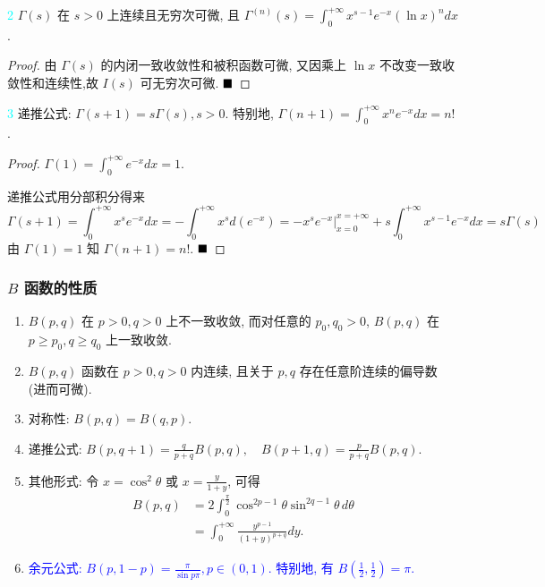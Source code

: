 \documentclass[lang=cn,newtx,10pt,scheme=chinese]{elegantbook}
\begin{document}
\begin{property}\textcolor{cyan}{2}
$\Gamma(s)$ 在 $s>0$ 上连续且无穷次可微, 且 $\Gamma^{(n)}(s) = \int_{0}^{+\infty} x^{s-1}e^{-x}(\ln x)^n dx$.
\end{property}
\begin{proof}
   由 $\Gamma(s)$ 的内闭一致收敛性和被积函数可微, 又因乘上 $\ln x$ 不改变一致收敛性和连续性,故 $I(s)$ 可无穷次可微. $\hfill \blacksquare$
\end{proof}

\begin{property}\textcolor{cyan}{3}
递推公式: $\Gamma(s+1)=s\Gamma(s), s>0$. 特别地, $\Gamma(n+1) = \int_0^{+\infty} x^n e^{-x} dx = n!$.
\end{property}
\begin{proof}
$\Gamma(1) = \int_0^{+\infty} e^{-x} dx = 1$.

递推公式用分部积分得来
$$ \Gamma(s+1) = \int_0^{+\infty} x^s e^{-x} dx = -\int_0^{+\infty} x^s d(e^{-x}) = -x^s e^{-x} \Big|_{x=0}^{x=+\infty} + s \int_0^{+\infty} x^{s-1} e^{-x} dx = s\Gamma(s) $$
由 $\Gamma(1)=1$ 知 $\Gamma(n+1) = n!$.
$\hfill \blacksquare$
\end{proof}

\subsubsection{$B$ 函数的性质}

\begin{enumerate}
    \item $B(p, q)$ 在 $p>0, q>0$ 上不一致收敛, 而对任意的 $p_0, q_0 > 0$, $B(p, q)$ 在 $p \ge p_0, q \ge q_0$ 上一致收敛.
    \item $B(p, q)$ 函数在 $p>0, q>0$ 内连续, 且关于 $p, q$ 存在任意阶连续的偏导数 (进而可微).
    \item 对称性: $B(p, q) = B(q, p)$.
    \item 递推公式: $B(p, q+1) = \frac{q}{p+q} B(p, q), \quad B(p+1, q) = \frac{p}{p+q} B(p, q)$.
    \item 其他形式: 令 $x=\cos^2\theta$ 或 $x=\frac{y}{1+y}$, 可得
    \begin{align*}
    B(p, q) &= 2 \int_0^{\frac{\pi}{2}} \cos^{2p-1}\theta \sin^{2q-1}\theta \, d\theta \\
    &= \int_0^{+\infty} \frac{y^{p-1}}{(1+y)^{p+q}} dy.
    \end{align*}
    \item \textcolor{blue}{余元公式: $B(p, 1-p) = \frac{\pi}{\sin p\pi}, p \in (0, 1)$. 特别地, 有 $B\left(\frac{1}{2}, \frac{1}{2}\right) = \pi$.}
\end{enumerate}
\end{document}
